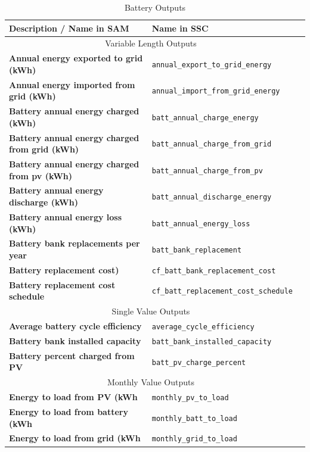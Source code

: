 \documentclass[12pt,letterpaper]{article}
\begin{document}
\begin{table}
\begin{center}
\caption{Battery Outputs}
\begin{tabular}{lll}
\midrule
Description / \textbf{Name in SAM} & Name in SSC \\
\midrule
\multicolumn{2}{c}{Variable Length Outputs}\\
\textbf{Annual energy exported to grid (kWh)} & \texttt{annual\_export\_to\_grid\_energy} \\
\textbf{Annual energy imported from grid (kWh)} & \texttt{annual\_import\_from\_grid\_energy} \\
\textbf{Battery annual energy charged (kWh)} & \texttt{batt\_annual\_charge\_energy} \\
\textbf{Battery annual energy charged from grid (kWh)} & \texttt{batt\_annual\_charge\_from\_grid} \\
\textbf{Battery annual energy charged from pv (kWh)} & \texttt{batt\_annual\_charge\_from\_pv} \\
\textbf{Battery annual energy discharge (kWh)} & \texttt{batt\_annual\_discharge\_energy} \\
\textbf{Battery annual energy loss (kWh)} & \texttt{batt\_annual\_energy\_loss} \\
\textbf{Battery bank replacements per year} & \texttt{batt\_bank\_replacement} \\
\textbf{Battery replacement cost)} & \texttt{cf\_batt\_bank\_replacement\_cost} \\
\textbf{Battery replacement cost schedule} & \texttt{cf\_batt\_replacement\_cost\_schedule} \\
\midrule
\multicolumn{2}{c}{Single Value Outputs}\\
\textbf{Average battery cycle efficiency} & \texttt{average\_cycle\_efficiency} \\
\textbf{Battery bank installed capacity} & \texttt{batt\_bank\_installed\_capacity} \\
\textbf{Battery percent charged from PV} & \texttt{batt\_pv\_charge\_percent} \\
\midrule
\multicolumn{2}{c}{Monthly Value Outputs}\\
\textbf{Energy to load from PV (kWh} & \texttt{monthly\_pv\_to\_load} \\
\textbf{Energy to load from battery (kWh} & \texttt{monthly\_batt\_to\_load} \\
\textbf{Energy to load from grid (kWh} & \texttt{monthly\_grid\_to\_load} \\

\end{tabular}
\end{center}
\end{table}
\end{document}
